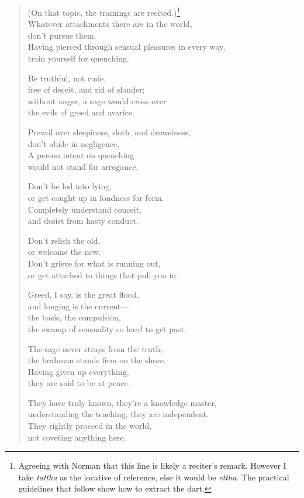 \documentclass[12pt,openany]{book}%
\begin{document}
\begin{verse}
(On that topic, the trainings are recited.)\footnote{Agreeing with Norman that this line is likely a reciter’s remark. However I take \textit{tattha} as the locative of reference, else it would be \textit{ettha}. The practical guidelines that follow show how to extract the dart. } \\
Whatever attachments there are in the world, \\
don’t pursue them. \\
Having pierced through sensual pleasures in every way, \\
train yourself for quenching. 

Be truthful, not rude, \\
free of deceit, and rid of slander; \\
without anger, a sage would cross over \\
the evils of greed and avarice. 

Prevail over sleepiness, sloth, and drowsiness, \\
don’t abide in negligence, \\
A person intent on quenching \\
would not stand for arrogance. 

Don’t be led into lying, \\
or get caught up in fondness for form. \\
Completely understand conceit, \\
and desist from hasty conduct. 

Don’t relish the old, \\
or welcome the new. \\
Don’t grieve for what is running out, \\
or get attached to things that pull you in. 

Greed, I say, is the great flood, \\
and longing is the current—\\
the basis, the compulsion, \\
the swamp of sensuality so hard to get past. 

The sage never strays from the truth; \\
the brahman stands firm on the shore. \\
Having given up everything, \\
they are said to be at peace. 

They have truly known, they’re a knowledge master, \\
understanding the teaching, they are independent. \\
They rightly proceed in the world, \\
not coveting anything here. 


\end{verse}
\end{document}

